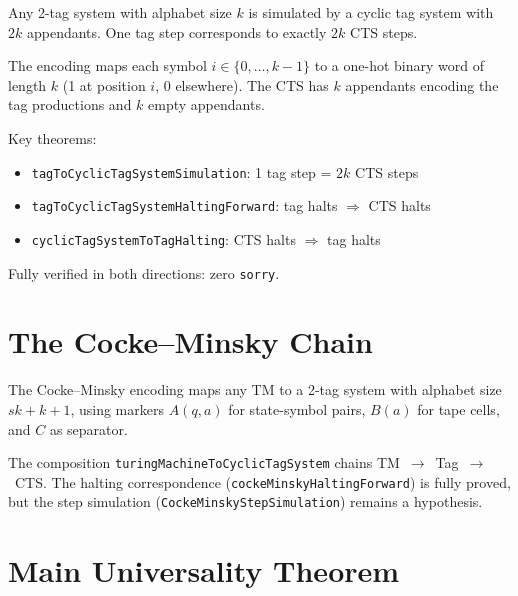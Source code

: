 \begin{proposition}\label{prop:tag-cts}
\leanok
{}
Any 2-tag system with alphabet size $k$ is simulated by a cyclic tag system
with $2k$ appendants. One tag step corresponds to exactly $2k$ CTS steps.

The encoding maps each symbol $i \in \{0,\ldots,k-1\}$ to a one-hot binary
word of length $k$ (1 at position $i$, 0 elsewhere). The CTS has $k$
appendants encoding the tag productions and $k$ empty appendants.

Key theorems:
\begin{itemize}
\item \texttt{tagToCyclicTagSystemSimulation}: 1 tag step = $2k$ CTS steps
\item \texttt{tagToCyclicTagSystemHaltingForward}: tag halts $\Rightarrow$ CTS halts
\item \texttt{cyclicTagSystemToTagHalting}: CTS halts $\Rightarrow$ tag halts
\end{itemize}
Fully verified in both directions: zero \texttt{sorry}.
\end{proposition}

\section{The Cocke--Minsky Chain}

\begin{proposition}\label{prop:cocke-minsky}
\notready
The Cocke--Minsky encoding maps any TM to a 2-tag system with alphabet
size $sk + k + 1$, using markers $A(q,a)$ for state-symbol pairs, $B(a)$
for tape cells, and $C$ as separator.

The composition \texttt{turingMachineToCyclicTagSystem} chains
TM~$\to$~Tag~$\to$~CTS. The halting correspondence
(\texttt{cockeMinskyHaltingForward}) is fully proved, but the step simulation
(\texttt{CockeMinskyStepSimulation}) remains a hypothesis.
\end{proposition}

\section{Main Universality Theorem}

